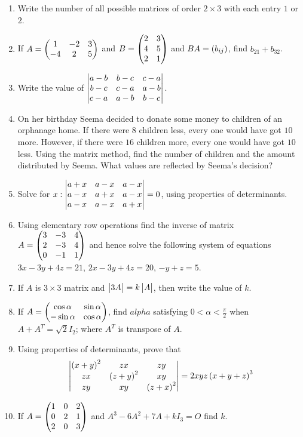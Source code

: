 \begin{enumerate}
\item Write the number of all possible matrices of order $2 \times 3$ with each entry $1$ or $2$.
\item If $A = \begin{pmatrix}1 & -2 & 3 \\ -4 & 2 & 5\end{pmatrix}$ and $B = \begin{pmatrix}2 & 3 \\ 4 & 5 \\ 2 & 1\end{pmatrix}$ and $BA = \left(b_{ij}\right)$, find $b_{21} + b_{32}$.
\item Write the value of $\begin{vmatrix}{a-b} & {b-c} & {c-a} \\ {b-c} & {c-a} & {a-b}\\ {c-a} & {a-b} & {b-c}\end{vmatrix}$.
\item On her birthday Seema decided to donate some money to children of an orphanage home. If there were $8$ children less, every one would have got \rupee$10$ more. However, if there were $16$ children more, every one would have got \rupee$10$ less. Using the matrix method, find the number of children and the amount distributed by Seema. What values are reflected by Seema's decision?
\item Solve for $x : \begin{vmatrix}a+x & a-x & a-x \\ a-x & a+x & a-x \\ a-x & a-x & a+x\end{vmatrix} = 0$, using properties of determinants.
\item Using elementary row operations find the inverse of matrix $A = \begin{pmatrix}3 & -3 & 4 \\ 2 & -3 & 4\\ 0 & -1 & 1\end{pmatrix}$ and hence solve the following system of equations $ 3x - 3y + 4z = 21$, $2x - 3y + 4z = 20$, $-y + z = 5$.
\item If $A$ is $3\times 3$ matrix and $\begin{vmatrix}3A\end{vmatrix} = k\begin{vmatrix}A\end{vmatrix}$, then write the value of $k$.

\item If $A = \begin{pmatrix}\cos{\alpha} & \sin{\alpha}\\ -\sin{\alpha} & \cos{\alpha}\end{pmatrix}$, find $alpha$ satisfying $0 < \alpha < \frac{\pi}{2}$ when $A + A^T = \sqrt{2}I_2$; where $A^T$ is transpose of $A$.

\item Using properties of determinants, prove that
\begin{align*}
	\begin{vmatrix}\left(x+y\right)^2 & zx & zy \\
	zx & \left(z+y\right)^2 & xy \\ zy & xy & \left(z+x\right)^2\end{vmatrix} = 2xyz\left(x+y+z\right)^3
\end{align*}

\item If $A = \begin{pmatrix}1 & 0 & 2 \\ 0 & 2 & 1 \\ 2 & 0 & 3\end{pmatrix}$ and $A^3 - 6A^2 + 7A + kI_3 = O$ find $k$.
\end{enumerate}
